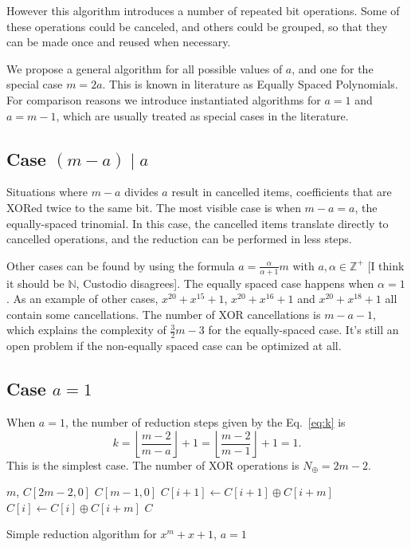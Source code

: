 However this algorithm introduces a number of repeated bit operations. Some of these operations could be canceled, and others could be grouped, so that they can be made once and reused when necessary.

We propose a general algorithm for all possible values of $a$, and one for the special case $m=2a$. This is known in literature as Equally Spaced Polynomials. For comparison reasons we introduce instantiated algorithms for $a = 1$ and $a = m-1$, which are usually treated as special cases in the literature.

\subsection{Case $(m-a) \mid a$}

Situations where $m-a$ divides $a$ result in cancelled items, coefficients that are XORed twice to the same bit. The most visible case is when $m-a = a$, the equally-spaced trinomial. In this case, the cancelled items translate directly to cancelled operations, and the reduction can be performed in less steps.

Other cases can be found by using the formula $a = \frac{\alpha}{\alpha + 1}m$ with $a, \alpha \in \mathbb{Z}^{+}$ [I think it should be $\mathbb{N}$, Custodio disagrees]. The equally spaced case happens when $\alpha = 1$. As an example of other cases, $x^{20}+x^{15}+1$, $x^{20}+x^{16}+1$ and $x^{20}+x^{18}+1$ all contain some cancellations. The number of XOR cancellations is $m - a - 1$, which explains the complexity of $\frac{3}{2}m - 3$ for the equally-spaced case. It's still an open problem if the non-equally spaced case can be optimized at all.

\subsection{Case $a=1$}
When $a=1$, the number of reduction steps given by the Eq.~\ref{eq:k} is $$k=\left \lfloor \frac{m-2}{m-a} \right \rfloor + 1=\left \lfloor \frac{m-2}{m-1} \right \rfloor + 1=1.$$ This is the simplest case. The number of XOR operations is $N_\oplus = 2m-2$.

 \begin{algorithm}
 \begin{algorithmic}[1]
  \REQUIRE $m$, $C[2m-2,0]$
  \ENSURE $C[m-1,0]$
      \STATE $C[i+1] \gets C[i+1] \oplus C[i+m]$
      \STATE $C[i] \gets C[i] \oplus C[i+m]$
  \ENDFOR
  \RETURN $C$
  \caption{Simple reduction algorithm for $x^m + x + 1$, $a = 1$}
  \label{alg:a1:bit:operation}
\end{algorithmic}
\end{algorithm}

